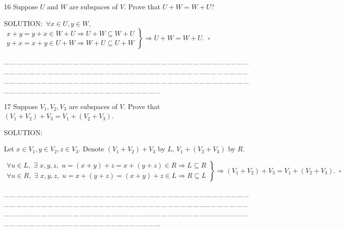 \documentclass[a4paper, 11pt, UTF8]{article}
\begin{document}
\begin{large}
{\timesbf\Large 16} {\timessl\Large 
Suppose $U$ and $W$ are subspaces of $V$. Prove that $U+W=W+U$?
}\par
{\timesbf S\footnotesize{OLUTION:}}\,\,\,$\forall x\in U,y\in W$,
$\left.\begin{array}{l}
x+y=y+x\in W+U\Rightarrow U+W\subseteq W+U \\
y+x=x+y\in U+W\Rightarrow W+U\subseteq U+W
\end{array}\right\}\Rightarrow U+W=W+U.\,\,\,\square$
\par
{\tiny \_\,\_\,\_\,\_\,\_\,\_\,\_\,\_\,\_\,\_\,\_\,\_\,\_\,\_\,\_\,\_\,\_\,\_\,\_\,\_\,\_\,\_\,\_\,\_\,\_\,\_\,\_\,\_\,\_\,\_\,\_\,\_\,\_\,\_\,\_\,\_\,\_\,\_\,\_\,\_\,\_\,\_\,\_\,\_\,\_\,\_\,\_\,\_\,\_\,\_\,\_\,\_\,\_\,\_\,\_\,\_\,\_\,\_\,\_\,\_\,\_\,\_\,\_\,\_\,\_\,\_\,\_\,\_\,\_\,\_\,\_\_\,\_\,\_\,\_\,\_\,\_\,\_\,\_\,\_\,\_\,\_\,\_\,\_\,\_\,\_\,\_\,\_\,\_\,\_\,\_\,\_\,\_\,\_\,\_\,\_\,\_\,\_\,\_\,\_\,\_\,\_\,\_\,\_\,\_\,\_\,\_\,\_\,\_\,\_\,\_\,\_\,\_\,\_\,\_\,\_\,\_\,\_\,\_\,\_\,\_\,\_\,\_\,\_\,\_\,\_\,\_\,\_\,\_\,\_\,\_\,\_\,\_\,\_\,\_\,\_\,\_\,\_\,\_\,\_\,\_\,\_}\par

{\timesbf\Large 17} {\timessl\Large 
Suppose $V_1,V_2,V_3$ are subspaces of $V$. Prove that $(V_1+V_2)+V_3=V_1+(V_2+V_3)$.
}\par
{\timesbf S\footnotesize{OLUTION:}}\par\quad
Let $x\in V_1,y\in V_2,z\in V_3.$ Denote $(V_1+V_2)+V_3$ by $L$, $V_1+(V_2+V_3)$ by $R$. \par\quad
{\small
$\left.\begin{array}{l}
\forall u\in L,\,\,\exists\,\,x,y,z,\,\,u=(x+y)+z=x+(y+z)\in R\Rightarrow L\subseteq R\\
\forall u\in R,\,\,\exists\,\,x,y,z,\,\,u=x+(y+z)=(x+y)+z\in L\Rightarrow R\subseteq L
\end{array}\right\}\Rightarrow (V_1+V_2)+V_3=V_1+(V_2+V_3).\,\,\,\square$}\par
{\tiny \_\,\_\,\_\,\_\,\_\,\_\,\_\,\_\,\_\,\_\,\_\,\_\,\_\,\_\,\_\,\_\,\_\,\_\,\_\,\_\,\_\,\_\,\_\,\_\,\_\,\_\,\_\,\_\,\_\,\_\,\_\,\_\,\_\,\_\,\_\,\_\,\_\,\_\,\_\,\_\,\_\,\_\,\_\,\_\,\_\,\_\,\_\,\_\,\_\,\_\,\_\,\_\,\_\,\_\,\_\,\_\,\_\,\_\,\_\,\_\,\_\,\_\,\_\,\_\,\_\,\_\,\_\,\_\,\_\,\_\,\_\_\,\_\,\_\,\_\,\_\,\_\,\_\,\_\,\_\,\_\,\_\,\_\,\_\,\_\,\_\,\_\,\_\,\_\,\_\,\_\,\_\,\_\,\_\,\_\,\_\,\_\,\_\,\_\,\_\,\_\,\_\,\_\,\_\,\_\,\_\,\_\,\_\,\_\,\_\,\_\,\_\,\_\,\_\,\_\,\_\,\_\,\_\,\_\,\_\,\_\,\_\,\_\,\_\,\_\,\_\,\_\,\_\,\_\,\_\,\_\,\_\,\_\,\_\,\_\,\_\,\_\,\_\,\_\,\_\,\_\,\_}\par


\end{large}
\end{document}
